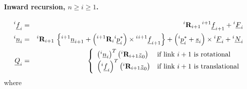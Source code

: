 \documentclass{article}
\renewcommand{\vec}[1]{\underline{#1}}
\begin{document}
\paragraph{Inward recursion, $n \geq i \geq 1$.}
\begin{eqnarray}
\mbox{}^i\vec{f}_i  & = &
	{}^i {\bf R}_{i+1}\,  \mbox{}^{i+1}\vec{f}_{i+1} + \mbox{}^i\vec{F}_i\\
\mbox{}^i\vec{n}_i & = &
	{}^i {\bf R}_{i+1} \, \left\{ \mbox{}^{i+1}\vec{n}_{i+1} +
	\left( {}^{i+1} {\bf R}_i \mbox{}^i\vec{p}_i^{*} \right) \times {}^i \mbox{}^{i+1}\vec{f}_{i+1}\right\} +
	\left(\mbox{}^i\vec{p}_i^{*} + \vec{s}_i\right) \times \mbox{}^i\vec{F}_i +
	\mbox{}^i\vec{N}_i  \label{eq:rne-ni} \\
\vec{Q}_i & = &  \left\{ \begin{array}{ll}
	\left(\mbox{}^i\vec{n}_i\right)^T \left({}^i {\bf R}_{i+1} \vec{z}_0\right) &
		\mbox{if link $i+1$ is rotational} \\
	\left(\mbox{}^i\vec{f}_i\right)^T \left({}^i {\bf R}_{i+1} \vec{z}_0\right)&
		\mbox{if link $i+1$ is translational}
	\end{array} \right.				\label{eq:rne-end}
\end{eqnarray}
where
\end{document}
